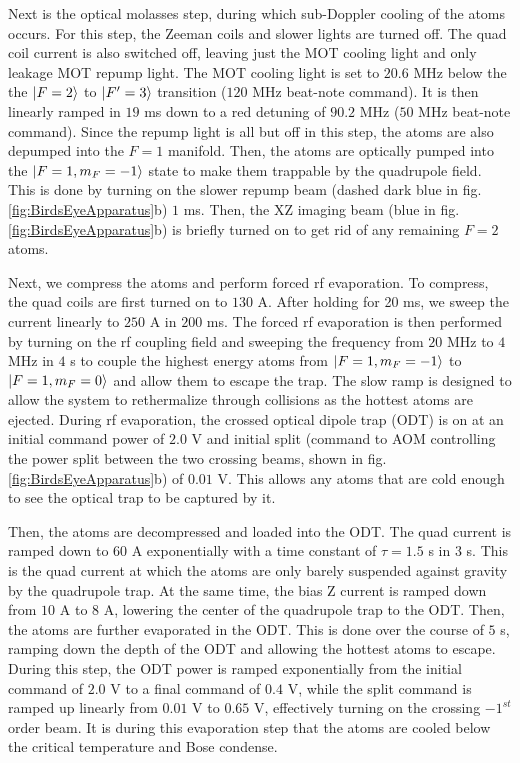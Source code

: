 Next is the optical molasses step, during which sub-Doppler cooling of the atoms occurs. For this step, the Zeeman coils and slower lights are turned off. The quad coil current is also switched off, leaving just the MOT cooling light and only leakage MOT repump light. The MOT cooling light is set to $20.6$ MHz below the the $\mathinner{|{F=2}\rangle}$ to $\mathinner{|{F'=3}\rangle}$ transition ($120$ MHz beat-note command). It is then linearly ramped in $19$ ms down to a red detuning of $90.2$ MHz ($50$ MHz beat-note command). Since the repump light is all but off in this step, the atoms are also depumped into the $F=1$ manifold. Then, the atoms are optically pumped into the $\mathinner{|{F=1,m_F=-1}\rangle}$ state to make them trappable by the quadrupole field. This is done by turning on the slower repump beam (dashed dark blue in fig. \ref{fig:BirdsEyeApparatus}b) $1$ ms. Then, the XZ imaging beam (blue in fig. \ref{fig:BirdsEyeApparatus}b) is briefly turned on to get rid of any remaining $F=2$ atoms. 

Next, we compress the atoms and perform forced rf evaporation. To compress, the quad coils are first turned on to $130$ A. After holding for 20 ms, we sweep the current linearly to $250$ A in $200$ ms. The forced rf evaporation is then performed by turning on the rf coupling field and sweeping the frequency from $20$ MHz to $4$ MHz in $4$ s to couple the highest energy atoms from $\mathinner{|{F=1,m_F=-1}\rangle}$ to $\mathinner{|{F=1,m_F=0}\rangle}$ and allow them to escape the trap. The slow ramp is designed to allow the system to rethermalize through collisions as the hottest atoms are ejected.  During rf evaporation, the crossed optical dipole trap (ODT) is on at an initial command power of $2.0$ V and initial split (command to AOM controlling the power split between the two crossing beams, shown in fig. \ref{fig:BirdsEyeApparatus}b) of $0.01$ V. This allows any atoms that are cold enough to see the optical trap  to be captured by it.

Then, the atoms are decompressed and loaded into the ODT. The quad current is ramped down to $60$ A exponentially with a time constant of $\tau=1.5$ s in $3$ s. This is the quad current at which the atoms are only barely suspended against gravity by the quadrupole trap. At the same time, the bias Z current is ramped down from $10$ A to $8$ A, lowering the center of the quadrupole trap to the ODT. Then, the atoms are further evaporated in the ODT. This is done over the course of $5$ s, ramping down the depth of the ODT and allowing the hottest atoms to escape. During this step, the ODT power is ramped exponentially from the initial command of $2.0$ V to a final command of $0.4$ V, while the split command is ramped up linearly from $0.01$ V to $0.65$ V, effectively turning on the crossing $-1^{st}$ order beam. It is during this evaporation step that the atoms are cooled below the critical temperature and Bose condense.

